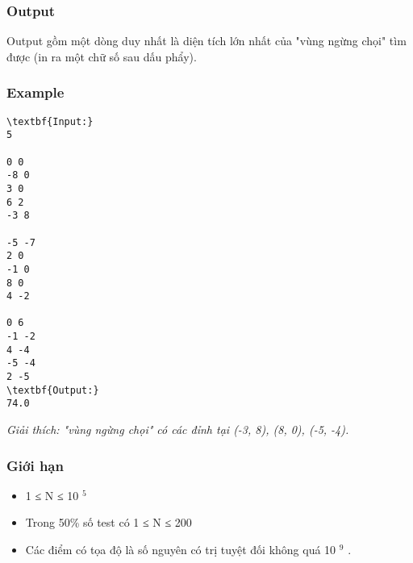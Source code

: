 \subsubsection{   Output  }

   Output gồm một dòng duy nhất là diện tích lớn nhất của "vùng ngừng chọi" tìm được (in ra một chữ số sau dấu phẩy).  

\subsubsection{   Example  }
\begin{verbatim}
\textbf{Input:}
5

0 0
-8 0
3 0
6 2
-3 8

-5 -7
2 0
-1 0
8 0
4 -2

0 6
-1 -2
4 -4
-5 -4
2 -5
\textbf{Output:}
74.0\end{verbatim}

\emph{    Giải thích: "vùng ngừng chọi" có các đỉnh tại (-3, 8), (8, 0), (-5, -4).   }

\subsubsection{   Giới hạn  }
\begin{itemize}
	\item     1 ≤ N ≤ 10    $^     5    $
	\item     Trong 50\% số test có 1 ≤ N ≤ 200   
	\item     Các điểm có tọa độ là số nguyên có trị tuyệt đối không quá 10    $^     9    $    .   
\end{itemize}